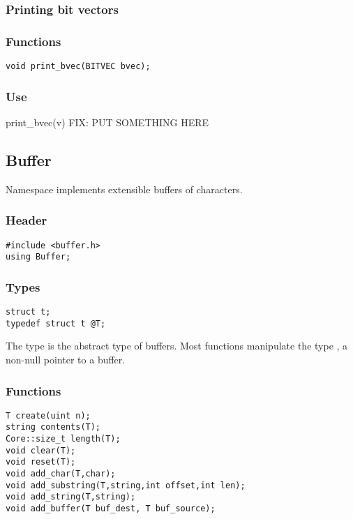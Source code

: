 \subsubsection*{Printing bit vectors}

\subsubsection*{Functions}
\begin{verbatim}
void print_bvec(BITVEC bvec);
\end{verbatim}

\subsubsection*{Use}

\begin{defun}{print_bvec}{(v)}
FIX: PUT SOMETHING HERE
\end{defun}

\subsection{Buffer}

Namespace  implements extensible buffers of characters.

\subsubsection*{Header}
\begin{verbatim}
#include <buffer.h>
using Buffer;
\end{verbatim}

\subsubsection*{Types}
\begin{verbatim}
struct t;
typedef struct t @T;
\end{verbatim}

The type  is the abstract type of buffers.  Most
functions manipulate the type , a non-null pointer to a buffer.

\subsubsection*{Functions}
\begin{verbatim}
T create(uint n);
string contents(T);
Core::size_t length(T);
void clear(T);
void reset(T);
void add_char(T,char);
void add_substring(T,string,int offset,int len);
void add_string(T,string);
void add_buffer(T buf_dest, T buf_source);
\end{verbatim}

